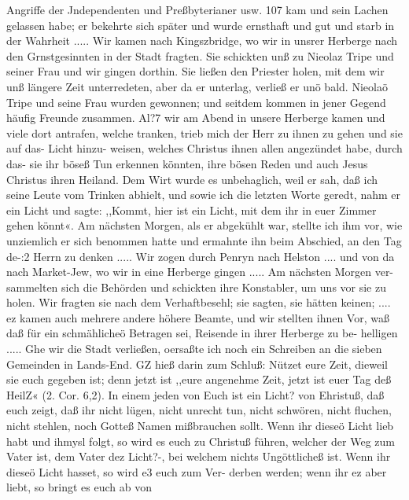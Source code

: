 Angriffe der Jndependenten und Preßbyterianer usw. 107
kam und sein Lachen gelassen habe; er bekehrte sich später und
wurde ernsthaft und gut und starb in der Wahrheit .....
Wir kamen nach Kingszbridge, wo wir in unsrer Herberge
nach den Grnstgesinnten in der Stadt fragten. Sie schickten unß
zu Nieolaz Tripe und seiner Frau und wir gingen dorthin. Sie
ließen den Priester holen, mit dem wir unß längere Zeit unterredeten,
aber da er unterlag, verließ er unö bald. Nieolaö Tripe und
seine Frau wurden gewonnen; und seitdem kommen in jener Gegend
häufig Freunde zusammen. Al?7 wir am Abend in unsere
Herberge kamen und viele dort antrafen, welche tranken, trieb
mich der Herr zu ihnen zu gehen und sie auf das- Licht hinzu-
weisen, welches Christus ihnen allen angezündet habe, durch das-
sie ihr böseß Tun erkennen könnten, ihre bösen Reden und auch
Jesus Christus ihren Heiland. Dem Wirt wurde es unbehaglich,
weil er sah, daß ich seine Leute vom Trinken abhielt, und sowie
ich die letzten Worte geredt, nahm er ein Licht und sagte: ,,Kommt,
hier ist ein Licht, mit dem ihr in euer Zimmer gehen könnt«. Am
nächsten Morgen, als er abgekühlt war, stellte ich ihm vor, wie
unziemlich er sich benommen hatte und ermahnte ihn beim Abschied,
an den Tag de-:2 Herrn zu denken ..... Wir zogen durch
Penryn nach Helston .... und von da nach Market-Jew, wo
wir in eine Herberge gingen ..... Am nächsten Morgen ver-
sammelten sich die Behörden und schickten ihre Konstabler, um
uns vor sie zu holen. Wir fragten sie nach dem Verhaftbesehl;
sie sagten, sie hätten keinen; .... ez kamen auch mehrere
andere höhere Beamte, und wir stellten ihnen Vor, waß daß für
ein schmählicheö Betragen sei, Reisende in ihrer Herberge zu be-
helligen ..... Ghe wir die Stadt verließen, oersaßte ich noch
ein Schreiben an die sieben Gemeinden in Lands-End. GZ hieß
darin zum Schluß: Nützet eure Zeit, dieweil sie euch gegeben
ist; denn jetzt ist ,,eure angenehme Zeit, jetzt ist euer Tag deß
HeilZ« (2. Cor. 6,2). In einem jeden von Euch ist ein Licht?
von Ehristuß, daß euch zeigt, daß ihr nicht lügen, nicht unrecht
tun, nicht schwören, nicht fluchen, nicht stehlen, noch Gotteß Namen
mißbrauchen sollt. Wenn ihr dieseö Licht lieb habt und ihmysl
folgt, so wird es euch zu Christuß führen, welcher der Weg zum
Vater ist, dem Vater dez Licht?-, bei welchem nichts Ungöttlicheß
ist. Wenn ihr dieseö Licht hasset, so wird e3 euch zum Ver-
derben werden; wenn ihr ez aber liebt, so bringt es euch ab von


